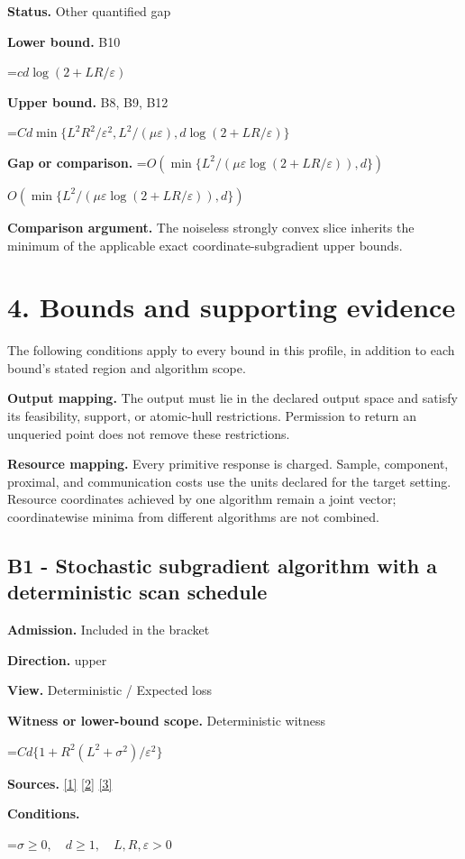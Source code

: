 \documentclass[10pt,a4paper]{article}
\newcommand{\AtlasMath}[1]{\par\begingroup\centering\setbox0=\hbox{$\displaystyle #1$}\ifdim\wd0>1.4\linewidth\typeout{ATLAS WIDE FORMULA: \the\wd0}\fi\ifdim\wd0>\linewidth\resizebox{\linewidth}{!}{\box0}\else\box0\fi\par\endgroup}
\newcommand{\AtlasInlineMath}[1]{\begingroup\setbox0=\hbox{$#1$}\ifdim\wd0>.4\linewidth\endgroup\AtlasMath{#1}\else\endgroup$#1$\fi}
\begin{document}
\textbf{Status.} Other quantified gap

\textbf{Lower bound.} B10

\AtlasMath{cd\log(2+LR/\varepsilon)}
\textbf{Upper bound.} B8, B9, B12

\AtlasMath{Cd\min\{L^2R^2/\varepsilon^2,L^2/(\mu\varepsilon),d\log(2+LR/\varepsilon)\}}
\textbf{Gap or comparison.} \AtlasInlineMath{O\!\left(\min\{L^2/(\mu\varepsilon\log(2+LR/\varepsilon)),d\}\right)}

\textbf{Comparison argument.} The noiseless strongly convex slice inherits the minimum of the applicable exact coordinate-subgradient upper bounds.

\section{4. Bounds and supporting evidence}
The following conditions apply to every bound in this profile, in addition to each bound's stated region and algorithm scope.

\textbf{Output mapping.} The output must lie in the declared output space and satisfy its feasibility, support, or atomic-hull restrictions. Permission to return an unqueried point does not remove these restrictions.

\textbf{Resource mapping.} Every primitive response is charged. Sample, component, proximal, and communication costs use the units declared for the target setting. Resource coordinates achieved by one algorithm remain a joint vector; coordinatewise minima from different algorithms are not combined.

\subsection{B1 - Stochastic subgradient algorithm with a deterministic scan schedule}
\textbf{Admission.} Included in the bracket

\textbf{Direction.} upper

\textbf{View.} Deterministic / Expected loss

\textbf{Witness or lower-bound scope.} Deterministic witness

\AtlasMath{Cd\{1+R^2(L^2+\sigma^2)/\varepsilon^2\}}
\textbf{Sources.} \href{https://arxiv.org/pdf/1405.4980}{[1]} \href{https://www2.isye.gatech.edu/~nemirovs/MOR_AccuracyCertificates.pdf}{[2]} \href{https://arxiv.org/pdf/2609.20701}{[3]}

\textbf{Conditions.} 
\AtlasMath{\sigma\ge0,\quad d\ge1,\quad L,R,\varepsilon>0}
\end{document}
